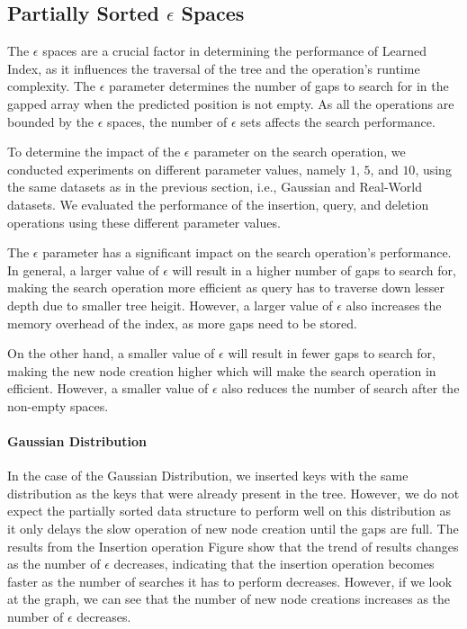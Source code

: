 \documentclass[11pt,a4paper]{article}
\newcommand{\learnindex}{\textsf{Learned Index}\xspace}
\begin{document}
\subsection{Partially Sorted $\epsilon$ Spaces}
The $\epsilon$ spaces are a crucial factor in determining the performance of \learnindex, as it influences the traversal of the tree and the operation's runtime complexity. The $\epsilon$ parameter determines the number of gaps to search for in the gapped array when the predicted position is not empty. As all the operations are bounded by the $\epsilon$ spaces, the number of $\epsilon$ sets affects the search performance.

To determine the impact of the $\epsilon$ parameter on the search operation, we conducted experiments on different parameter values, namely $1$, $5$, and $10$, using the same datasets as in the previous section, i.e., Gaussian and Real-World datasets. We evaluated the performance of the insertion, query, and deletion operations using these different parameter values.

The $\epsilon$ parameter has a significant impact on the search operation's performance. In general, a larger value of $\epsilon$ will result in a higher number of gaps to search for, making the search operation more efficient as query has to traverse down lesser depth due to smaller tree heigit. However, a larger value of $\epsilon$ also increases the memory overhead of the index, as more gaps need to be stored. 

On the other hand, a smaller value of $\epsilon$ will result in fewer gaps to search for, making the new node creation higher which will make the search operation in efficient. However, a smaller value of $\epsilon$ also reduces the number of search after the non-empty spaces.


\paragraph{Gaussian Distribution}In the case of the Gaussian Distribution, we inserted keys with the same distribution as the keys that were already present in the tree. However, we do not expect the partially sorted data structure to perform well on this distribution as it only delays the slow operation of new node creation until the gaps are full. The results from the Insertion operation Figure show that the trend of results changes as the number of $\epsilon$ decreases, indicating that the insertion operation becomes faster as the number of searches it has to perform decreases. However, if we look at the graph, we can see that the number of new node creations increases as the number of $\epsilon$ decreases.
\end{document}

